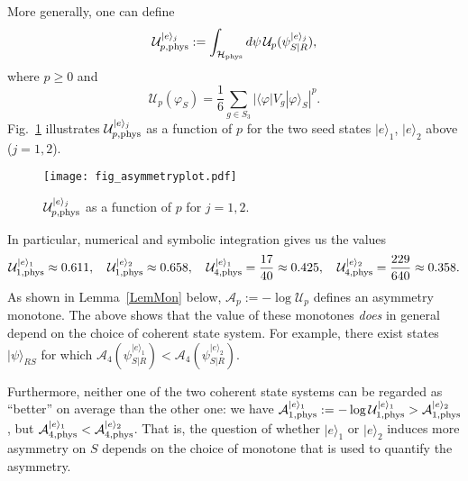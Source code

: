 \documentclass[aps,10pt,twocolumn,showpacs,pra,citeautoscript,amsmath,amssymb,floatfix,superscriptaddress]{revtex4-1}
\begin{document}
More generally, one can define
\[
    \mathcal{U}_{p,{\rm phys}}^{|e\rangle_j}:= \int_{\mathcal{H}_{\rm phys}} d\psi\,\mathcal{U}_{p}(\psi_{S|R}^{|e\rangle_j}),
\]
where $p\geq 0$ and
\[
    \mathcal{U}_p(\varphi_S)=\frac{1}{6} \sum_{g\in S_3} |\langle\varphi| V_g |\varphi\rangle_S |^p.
\]
Fig.~\ref{fig: asymmetry} illustrates $\mathcal{U}_{p,{\rm phys}}^{|e\rangle_j}$ as a function of $p$ for the two seed states $|e\rangle_1$, $|e\rangle_2$ above ($j=1,2$).
\begin{figure}[ht]
    \centering
    \texttt{[image: fig\_asymmetryplot.pdf]}
    \caption{$\mathcal{U}_{p,{\rm phys}}^{|e\rangle_j}$ as a function of $p$ for $j=1,2$.}
    \label{fig: asymmetry}
\end{figure}

In particular, numerical and symbolic integration gives us the values
\[
   \mathcal{U}_{1,{\rm phys}}^{|e\rangle_1}\approx 0.611,\quad \mathcal{U}_{1,{\rm phys}}^{|e\rangle_2}\approx 0.658,\quad \mathcal{U}_{4,{\rm phys}}^{|e\rangle_1}=\frac{17}{40} \approx 0.425,\quad  \mathcal{U}_{4,{\rm phys}}^{|e\rangle_2} = \frac{229}{640} \approx 0.358.
\]
As shown in Lemma~\ref{LemMon} below, $\mathcal{A}_p:=-\log \mathcal{U}_p$ defines an asymmetry monotone. The above shows that the value of these monotones \emph{does} in general depend on the choice of coherent state system. For example, there exist states $|\psi\rangle_{RS}$ for which $\mathcal{A}_4(\psi_{S|R}^{|e\rangle_1})<\mathcal{A}_4(\psi_{S|R}^{|e\rangle_2})$.

Furthermore, neither one of the two coherent state systems can be regarded as ``better'' on average than the other one: we have $\mathcal{A}_{1,{\rm phys}}^{|e\rangle_1}:=-\log \mathcal{U}_{1,{\rm phys}}^{|e\rangle_1}>\mathcal{A}_{1,{\rm phys}}^{|e\rangle_2}$, but $\mathcal{A}_{4,{\rm phys}}^{|e\rangle_1}<\mathcal{A}_{4,{\rm phys}}^{|e\rangle_2}$. That is, the question of whether $|e\rangle_1$ or $|e\rangle_2$ induces more asymmetry on $S$ depends on the choice of monotone that is used to quantify the asymmetry.
\end{document}
